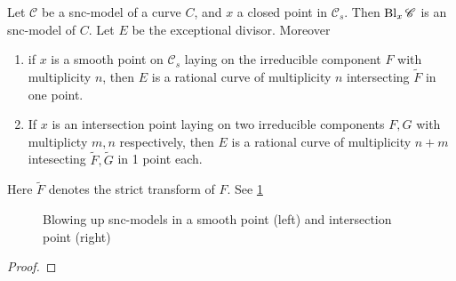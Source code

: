 \begin{lemma}\label{lem:blowup_snc}
	Let $\mathscr C$ be a snc-model of a curve $C$, and $x$ a closed point in $\mathscr C_s$. 
	Then $\operatorname{Bl}_x\mathscr C$ is an snc-model of $C$. Let $E$ be the exceptional divisor. 
	Moreover 
	\begin{enumerate}
		\item if $x$ is a smooth point on $\mathscr C_s$ laying on the irreducible component $F$ with multiplicity $n$, then $E$ is a rational curve of multiplicity $n$ intersecting $\tilde F$ in one point. 
		\item If $x$ is an intersection point laying on two irreducible components $F, G$ with multiplicty  $m, n$ respectively, then $E$ is a rational curve of multiplicity $n + m$ intesecting $\tilde F, \tilde G$ in 1 point each. 
	\end{enumerate}
	Here $\tilde F$ denotes the strict transform of $F$. 
	See \cref{fig:blowup-snc}
\end{lemma}
\begin{figure}[ht]
    \centering
    \caption{Blowing up snc-models in a smooth point (left) and intersection point (right)}
    \label{fig:blowup-snc}
\end{figure}
\begin{proof}
\end{proof}




